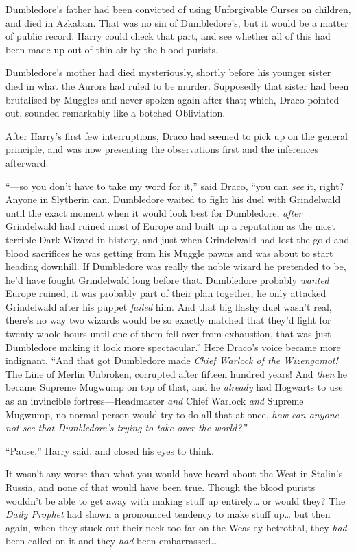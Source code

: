 Dumbledore's father had been convicted of using Unforgivable Curses on
children, and died in Azkaban. That was no sin of Dumbledore's, but it
would be a matter of public record. Harry could check that part, and see
whether all of this had been made up out of thin air by the blood
purists.

Dumbledore's mother had died mysteriously, shortly before his younger
sister died in what the Aurors had ruled to be murder. Supposedly that
sister had been brutalised by Muggles and never spoken again after that;
which, Draco pointed out, sounded remarkably like a botched Obliviation.

After Harry's first few interruptions, Draco had seemed to pick up on
the general principle, and was now presenting the observations first and
the inferences afterward.

``---so you don't have to take my word for it,'' said Draco, ``you can
\emph{see} it, right? Anyone in Slytherin can. Dumbledore waited to
fight his duel with Grindelwald until the exact moment when it would
look best for Dumbledore, \emph{after} Grindelwald had ruined most of
Europe and built up a reputation as the most terrible Dark Wizard in
history, and just when Grindelwald had lost the gold and blood
sacrifices he was getting from his Muggle pawns and was about to start
heading downhill. If Dumbledore was really the noble wizard he pretended
to be, he'd have fought Grindelwald long before that. Dumbledore
probably \emph{wanted} Europe ruined, it was probably part of their plan
together, he only attacked Grindelwald after his puppet \emph{failed}
him. And that big flashy duel wasn't real, there's no way two wizards
would be so exactly matched that they'd fight for twenty whole hours
until one of them fell over from exhaustion, that was just Dumbledore
making it look more spectacular.'' Here Draco's voice became more
indignant. ``And that got Dumbledore made \emph{Chief Warlock of the
Wizengamot!} The Line of Merlin Unbroken, corrupted after fifteen
hundred years! And \emph{then} he became Supreme Mugwump on top of that,
and he \emph{already} had Hogwarts to use as an invincible
fortress---Headmaster \emph{and} Chief Warlock \emph{and} Supreme
Mugwump, no normal person would try to do all that at once, \emph{how
can anyone not see that Dumbledore's trying to take over the world?''}

``Pause,'' Harry said, and closed his eyes to think.

It wasn't any worse than what you would have heard about the West in
Stalin's Russia, and none of that would have been true. Though the blood
purists wouldn't be able to get away with making stuff up
entirely\ldots{} or would they? The \emph{Daily Prophet} had shown a
pronounced tendency to make stuff up\ldots{} but then again, when they
stuck out their neck too far on the Weasley betrothal, they \emph{had}
been called on it and they \emph{had} been embarrassed\ldots{}

